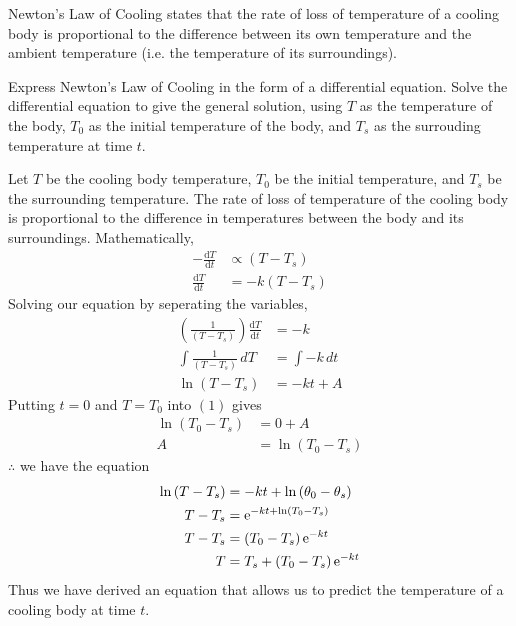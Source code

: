 \documentclass[11pt,a4paper]{book}
\begin{document}
\newpage



\begin{example}

Newton's Law of Cooling states that the rate of loss of
temperature of a cooling body is proportional to the difference between its own temperature and the ambient temperature (i.e. the temperature of its surroundings).

\medskip

Express Newton's Law of Cooling in the form of a differential equation.
Solve the differential equation to give the general solution, using
$T$ as the temperature of the body, $T_{0}$ as the initial temperature
of the body, and $T_{s}$ as the surrouding temperature at time $t$.

\Solution

Let $T$ be the cooling body temperature, $T_{0}$ be the initial
temperature, and $T_{s}$ be the surrounding temperature. The rate
of loss of temperature of the cooling body is proportional to the
difference in temperatures between the body and its surroundings.
Mathematically,
\begin{align*}
-\frac{\mathrm{d}T}{\mathrm{d}t} & \propto\left(T-T_{s}\right)\\
\frac{\mathrm{d}T}{\mathrm{d}t} & =-k\left(T-T_{s}\right)
\end{align*}
Solving our equation by seperating the variables,
\begin{align*}
\left(\frac{1}{\left(T-T_{s}\right)}\right)\frac{\mathrm{d}T}{\mathrm{d}t} & =-k\\
\int\frac{1}{\left(T-T_{s}\right)}\,dT & =\int-k\,dt\\
\ln\left(T-T_{s}\right) & =-kt+A\tag{1}
\end{align*}
Putting $t=0$ and $T=T_{0}$ into $\left(1\right)$ gives
\begin{align*}
\ln\left(T_{0}-T_{s}\right) & =0+A\\
A & =\ln\left(T_{0}-T_{s}\right)
\end{align*}
$\therefore$ we have the equation
\begin{align*}
\ln\left(T-T_{s}\right) & =-kt+\ln\left(\theta_{0}-\theta_{s}\right)\\
T-T_{s} & ={\rm e}^{-kt+\ln\left(T_{0}-T_{s}\right)}\\
T-T_{s} & =\left(T_{0}-T_{s}\right){\rm e}^{-kt}\\
T & =T_{s}+\left(T_{0}-T_{s}\right){\rm e}^{-kt}
\end{align*}
Thus we have derived an equation that allows us to predict the temperature of a cooling body at time $t$.

\end{example}
\end{document}
